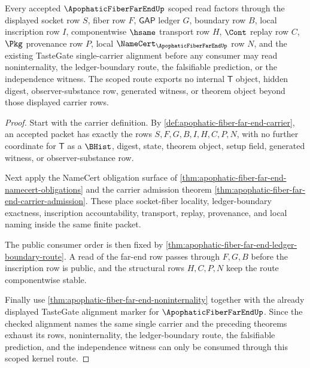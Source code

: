 \begin{theorem}
\label{thm:apophatic-fiber-far-end-scoped-kernel-route}
Every accepted $\ApophaticFiberFarEndUp$ scoped read factors through the displayed socket row $S$, fiber row $F$, $\mathsf{GAP}$ ledger $G$, boundary row $B$, local inscription row $I$, componentwise $\hsame$ transport row $H$, $\Cont$ replay row $C$, $\Pkg$ provenance row $P$, local $\NameCert_{\ApophaticFiberFarEndUp}$ row $N$, and the existing TasteGate single-carrier alignment before any consumer may read noninternality, the ledger-boundary route, the falsifiable prediction, or the independence witness. The scoped route exports no internal $\mathsf{T}$ object, hidden digest, observer-substance row, generated witness, or theorem object beyond those displayed carrier rows.
\end{theorem}
\begin{proof}
Start with the carrier definition. By \autoref{def:apophatic-fiber-far-end-carrier}, an accepted packet has exactly the rows $S,F,G,B,I,H,C,P,N$, with no further coordinate for $\mathsf{T}$ as a $\BHist$, digest, state, theorem object, setup field, generated witness, or observer-substance row.

Next apply the NameCert obligation surface of \autoref{thm:apophatic-fiber-far-end-namecert-obligations} and the carrier admission theorem \autoref{thm:apophatic-fiber-far-end-carrier-admission}. These place socket-fiber locality, ledger-boundary exactness, inscription accountability, transport, replay, provenance, and local naming inside the same finite packet.

The public consumer order is then fixed by \autoref{thm:apophatic-fiber-far-end-ledger-boundary-route}. A read of the far-end row passes through $F,G,B$ before the inscription row is public, and the structural rows $H,C,P,N$ keep the route componentwise stable.

Finally use \autoref{thm:apophatic-fiber-far-end-noninternality} together with the already displayed TasteGate alignment marker for $\ApophaticFiberFarEndUp$. Since the checked alignment names the same single carrier and the preceding theorems exhaust its rows, noninternality, the ledger-boundary route, the falsifiable prediction, and the independence witness can only be consumed through this scoped kernel route.
\end{proof}

